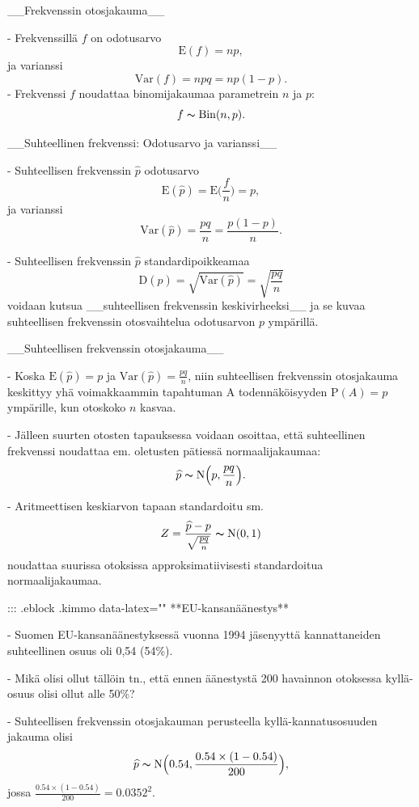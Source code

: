 \documentclass[
]{book}
\begin{document}
\begin{itemize}
__Frekvenssin otosjakauma__

- Frekvenssillä $f$ on odotusarvo
$$
\text{E}(f) = np,
$$
ja varianssi
$$
\mathrm{Var}(f) = npq = np(1-p).
$$
- Frekvenssi $f$ noudattaa binomijakaumaa parametrein $n$ ja $p$:
$$
f \thicksim \mathrm{Bin}(n,p).
$$

__Suhteellinen frekvenssi: Odotusarvo ja varianssi__

- Suhteellisen frekvenssin $\widehat{p}$ odotusarvo
$$
\text{E}(\widehat{p}) = \text{E} \Big(\frac{f}{n} \Big) = p,
$$
ja varianssi
$$
\mathrm{Var}(\widehat{p}) = \frac{pq}{n} = \frac{p(1-p)}{n}.
$$

- Suhteellisen frekvenssin $\widehat{p}$ standardipoikkeamaa
$$
\text{D}(\widehat{p}) = \sqrt{\mathrm{Var} (\widehat{p})} =  \sqrt{\frac{pq}{n}}
$$
voidaan kutsua __suhteellisen frekvenssin keskivirheeksi__ ja se kuvaa suhteellisen frekvenssin otosvaihtelua odotusarvon $p$ ympärillä.

__Suhteellisen frekvenssin otosjakauma__

- Koska $\text{E}(\widehat{p}) = p$ ja $\mathrm{Var}(\widehat{p}) = \frac{pq}{n}$, 
niin suhteellisen frekvenssin otosjakauma keskittyy yhä voimakkaammin tapahtuman A
todennäköisyyden $\text{P}(A) = p$ ympärille, kun otoskoko $n$ kasvaa.

- Jälleen suurten otosten tapauksessa voidaan osoittaa, että suhteellinen frekvenssi noudattaa em. oletusten pätiessä normaalijakaumaa:
$$
\widehat{p} \thicksim \text{N} \Big(p, \frac{pq}{n} \Big).
$$

- Aritmeettisen keskiarvon tapaan standardoitu sm. 
$$
Z = \frac{\widehat{p} - p}{\sqrt{\frac{pq}{n}}} \thicksim \text{N}(0,1)
$$
noudattaa suurissa otoksissa approksimatiivisesti standardoitua normaalijakaumaa.

::: {.eblock .kimmo data-latex="{}"}
**EU-kansanäänestys**  


- Suomen EU-kansanäänestyksessä vuonna 1994 jäsenyyttä kannattaneiden suhteellinen osuus oli 0,54 (54\%).

- Mikä olisi ollut tällöin tn., että ennen äänestystä 200 havainnon otoksessa kyllä-osuus olisi ollut alle 50\%?

- Suhteellisen frekvenssin otosjakauman perusteella kyllä-kannatusosuuden jakauma olisi
$$
\widehat{p} \thicksim \text{N} \Big(0.54, \frac{0.54 \times (1-0.54)}{200} \Big),
$$
jossa $\frac{0.54 \times (1-0.54)}{200} = 0.0352^2$.


\end{itemize}
\end{document}
